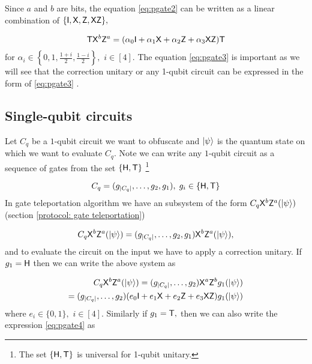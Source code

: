 Since $a$ and $b$ are bits, the equation \ref{eq:pgate2} can be written as a linear combination of $\{{\sf I}, {\sf X}, {\sf Z}, {\sf X} {\sf Z}\},$

\begin{equation}
\label{eq:pgate3}
\begin{aligned}
{\sf T} {\sf X}^b {\sf Z}^a= (\alpha_0 {\sf I} +  \alpha_1 {\sf X} + \alpha_2 {\sf Z} + \alpha_3 {\sf X}{\sf Z}){\sf T} \\
\end{aligned}
\end{equation}
for   $\alpha_i \in\left\{0,1, \frac{1+i}{2}, \frac{1-i}{2}\right\},$  $i\in[4].$ The equation \ref{eq:pgate3} is important as we will see that the correction unitary or any 1-qubit circuit can be expressed in the form of \ref{eq:pgate3} .

\subsection{Single-qubit circuits}
\label{sec:1-qubit}

Let $C_q$ be a $1$-qubit circuit we want to obfuscate and ${\lvert}\psi\rangle$ is the quantum state on which we want to evaluate $C_q.$ Note we can write any $1$-qubit circuit as a sequence of gates from the set $\{{\sf H}, {\sf T}\}$ \footnote{The set $\{{\sf H},  {\sf T}\}$ is universal for 1-qubit unitary.}

$$C_q=(g_{|C_q|},\ldots,g_2,g_1 ),\; g_i\in\{{\sf H}, {\sf T}\}$$
In gate teleportation algorithm we have an subsystem of the form $C_q {\sf X}^b{\sf Z}^a ({\lvert}\psi\rangle)$ (section \ref{protocol: gate  teleportation})

\begin{equation}
\label{eq:pgate4}
C_q {\sf X}^b{\sf Z}^a ({\lvert}\psi\rangle)=(g_{|C_q|},\ldots,g_2,g_1 ){\sf X}^b{\sf Z}^a ({\lvert}\psi\rangle),
\end{equation}
and to evaluate the circuit on the input we have to apply a correction unitary. If $g_1={\sf H}$ then we can write the above system as

\begin{equation}
\begin{aligned}
\label{eq:pgate5}
C_q {\sf X}^b{\sf Z}^a ({\lvert}\psi\rangle)=(g_{|C_q|},\ldots,g_2)  {\sf X}^a {\sf Z}^b g_1 ({\lvert}\psi\rangle) \\
=(g_{|C_q|},\ldots,g_2)(e_0 {\sf I} +  e_1 {\sf X} + e_2 {\sf Z} + e_3{\sf X} {\sf Z})g_1 ({\lvert}\psi\rangle)
\end{aligned}
\end{equation}
where  $e_i \in \{0,1\},$  $i\in[4].$ Similarly if $g_1={\sf T},$ then we can also write the expression \ref{eq:pgate4} as

